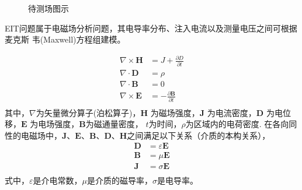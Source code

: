 \begin{figure}[h]
  
  \centering

\caption{待测场图示}
\label{figure:eeeee}

\end{figure}



EIT问题属于电磁场分析问题，其电导率分布、注入电流以及测量电压之间可根据麦克斯
韦(Maxwell)方程组建模。

\begin{equation}
\label{equation:Maxwell}
    \begin{aligned}
        \nabla \times \boldsymbol{H} &= J + \frac{\partial{D}}{\partial{t}} \\
        \nabla \cdot \boldsymbol{D} &= \rho \\
        \nabla \cdot \boldsymbol{B} &= 0 \\
        \nabla \times\boldsymbol{E} &= -\frac{\partial \boldsymbol{B}}{\partial t} \\   
    \end{aligned}
\end{equation}
其中，$\nabla$为矢量微分算子(泊松算子)，$\boldsymbol{H}$ 为磁场强度，$\boldsymbol{J}$ 为电流密度，$\boldsymbol{D}$
为电位移，$\boldsymbol{E}$ 为电场强度，$\boldsymbol{B}$为磁通量密度， $t$为时间，$\rho$为区域内的电荷密度.
在各向同性的电磁场中，$\boldsymbol{J}$、$\boldsymbol{E}$、$\boldsymbol{B}$、$\boldsymbol{D}$、$\boldsymbol{H}$之间满足以下关系（介质的本构关系），
\begin{equation}
  \label{equation:Maxwell_relation}
  \begin{aligned}
    \boldsymbol{D} &= \varepsilon\boldsymbol{E}\\
    \boldsymbol{B} & = \mu\boldsymbol{E}\\
    \boldsymbol{J} & = \sigma\boldsymbol{E}\\
  \end{aligned}
\end{equation}
式中，$\varepsilon$是介电常数，$\mu$是介质的磁导率，$\sigma$是电导率。

